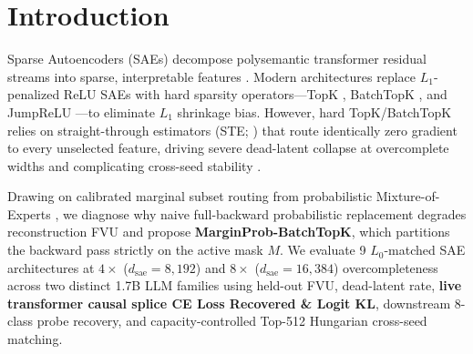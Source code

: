 \documentclass[10pt]{article}
\begin{document}
\section{Introduction}
Sparse Autoencoders (SAEs) decompose polysemantic transformer residual streams into sparse, interpretable features \citep{bricken2023monosemanticity,cunningham2024sae}. Modern architectures replace $L_1$-penalized ReLU SAEs with hard sparsity operators---TopK \citep{gao2024scaling}, BatchTopK \citep{bussmann2024batchtopk}, and JumpReLU \citep{rajamanoharan2024jumprelu}---to eliminate $L_1$ shrinkage bias. However, hard TopK/BatchTopK relies on straight-through estimators (STE; \citealt{bengio2013ste}) that route identically zero gradient to every unselected feature, driving severe dead-latent collapse at overcomplete widths and complicating cross-seed stability \citep{paulo2025sae}.

Drawing on calibrated marginal subset routing from probabilistic Mixture-of-Experts \citep{probmoe2026}, we diagnose why naive full-backward probabilistic replacement degrades reconstruction FVU and propose \textbf{MarginProb-BatchTopK}, which partitions the backward pass strictly on the active mask $M$. We evaluate 9 $L_0$-matched SAE architectures at $4\times$ ($d_{\mathrm{sae}}=8{,}192$) and $8\times$ ($d_{\mathrm{sae}}=16{,}384$) overcompleteness across two distinct 1.7B LLM families using held-out FVU, dead-latent rate, \textbf{live transformer causal splice CE Loss Recovered \& Logit KL}, downstream 8-class probe recovery, and capacity-controlled Top-512 Hungarian cross-seed matching.
\end{document}
